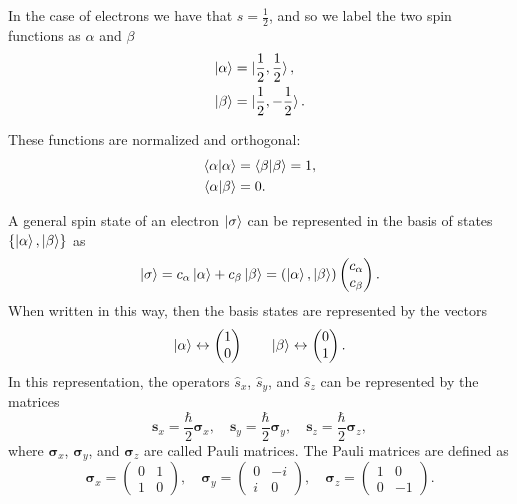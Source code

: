 \documentclass[../Main/chem532-notes.tex]{subfiles}
\begin{document}
In the case of electrons we have that $s = \frac{1}{2}$, and so we label the two spin functions as $\alpha$ and $\beta$
\begin{align}
\ket{\alpha} &= \ket{\frac{1}{2},\frac{1}{2}}, \\
\ket{\beta} &= \ket{\frac{1}{2},-\frac{1}{2}}.
\end{align}

These functions are normalized and orthogonal:
\begin{align}
\braket{\alpha | \alpha} &= \braket{\beta | \beta} = 1, \\
\braket{\alpha | \beta} &= 0. \label{eq:spin_orthogonality}
\end{align}

A general spin state of an electron $\ket{\sigma}$ can be represented in the basis of states $\{ \ket{\alpha}, \ket{\beta} \}$ as
\begin{equation}
\ket{\sigma} = c_\alpha \ket{\alpha} + c_\beta \ket{\beta} = ( \ket{\alpha}, \ket{\beta})
\begin{pmatrix}
c_\alpha \\
c_\beta
\end{pmatrix}.
\end{equation}
When written in this way, then the basis states are represented by the vectors
\begin{equation}
\ket{\alpha} \leftrightarrow 
\begin{pmatrix}
1 \\
0
\end{pmatrix}
\quad \quad
\ket{\beta} \leftrightarrow 
\begin{pmatrix}
0 \\
1
\end{pmatrix}.
\end{equation}
In this representation, the operators $\hat{s}_x$, $\hat{s}_y$, and $\hat{s}_z$ can be represented by the matrices
\begin{equation}
\mathbf{s}_x = \frac{\hbar}{2} \boldsymbol{\sigma}_x, \quad
\mathbf{s}_y = \frac{\hbar}{2} \boldsymbol{\sigma}_y, \quad
\mathbf{s}_z = \frac{\hbar}{2} \boldsymbol{\sigma}_z,
\end{equation}
where $\boldsymbol{\sigma}_x$, $\boldsymbol{\sigma}_y$, and $\boldsymbol{\sigma}_z$ are called Pauli matrices.
The Pauli matrices are defined as
\begin{equation}
\boldsymbol{\sigma}_x = 
\begin{pmatrix}
0 & 1 \\
1 & 0
\end{pmatrix}, \quad
\boldsymbol{\sigma}_y = 
\begin{pmatrix}
0 & -i \\
i & 0
\end{pmatrix}, \quad
\boldsymbol{\sigma}_z = 
\begin{pmatrix}
1 & 0 \\
0 & -1
\end{pmatrix}.
\end{equation}
\end{document}
